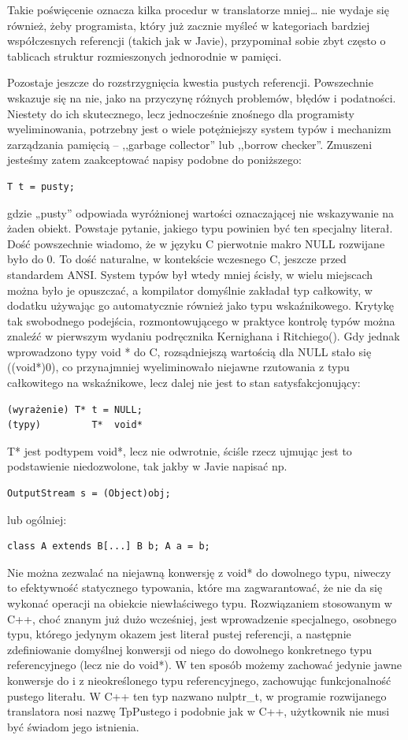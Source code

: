 Takie poświęcenie oznacza kilka procedur w translatorze mniej… nie wydaje się również, żeby programista, który już zacznie myśleć w kategoriach bardziej współczesnych referencji (takich jak w Javie), przypominał sobie zbyt często o tablicach struktur rozmieszonych jednorodnie w pamięci.

Pozostaje jeszcze do rozstrzygnięcia kwestia pustych referencji. Powszechnie wskazuje się na nie, jako na przyczynę różnych problemów, błędów i podatności. Niestety do ich skutecznego, lecz jednocześnie znośnego dla programisty wyeliminowania, potrzebny jest o wiele potężniejszy system typów i mechanizm zarządzania pamięcią – ,,garbage collector'' lub ,,borrow checker''. Zmuszeni jesteśmy zatem zaakceptować napisy podobne do poniższego:
\begin{lstlisting}
T t = pusty;    
\end{lstlisting}
 gdzie „pusty” odpowiada wyróżnionej wartości oznaczającej nie wskazywanie na żaden obiekt. Powstaje  pytanie, jakiego typu powinien być ten specjalny literał. Dość powszechnie wiadomo, że w języku C pierwotnie makro NULL rozwijane było do 0\cite[str.~214]{KiR}. To dość naturalne, w kontekście wczesnego C, jeszcze przed standardem ANSI. System typów był wtedy mniej ścisły, w wielu miejscach można było je opuszczać, a kompilator domyślnie zakładał typ całkowity, w dodatku używając go automatycznie również jako typu wskaźnikowego. Krytykę tak swobodnego podejścia, rozmontowującego w praktyce kontrolę typów można znaleźć w pierwszym wydaniu podręcznika Kernighana i Ritchiego(\cite{KiR}). Gdy jednak wprowadzono  typy void * do C, rozsądniejszą wartością dla NULL stało się ((void*)0), co przynajmniej wyeliminowało niejawne rzutowania z typu całkowitego na wskaźnikowe, lecz dalej nie jest to stan satysfakcjonujący:
\begin{lstlisting}
(wyrażenie) T* t = NULL;
(typy)         T*  void*
\end{lstlisting}
T* jest podtypem void*, lecz nie odwrotnie, ściśle rzecz ujmując jest to podstawienie niedozwolone, tak jakby w Javie napisać np.
\begin{lstlisting}
OutputStream s = (Object)obj;
\end{lstlisting}
lub ogólniej:
\begin{lstlisting}
class A extends B[...] B b; A a = b;
\end{lstlisting}
Nie można zezwalać na niejawną konwersję z void* do dowolnego typu, niweczy to efektywność statycznego typowania, które ma zagwarantować, że nie da się wykonać operacji na obiekcie niewłaściwego typu. Rozwiązaniem stosowanym w C++, choć znanym już dużo wcześniej\cite[str.256 - zob. nil\_typ]{waite_goos}, jest wprowadzenie specjalnego, osobnego typu, którego jedynym okazem jest literał pustej referencji, a następnie zdefiniowanie domyślnej konwersji od niego do dowolnego konkretnego typu referencyjnego (lecz nie do void*). W ten sposób możemy zachować jedynie jawne konwersje do i z nieokreślonego typu referencyjnego,  zachowując funkcjonalność pustego literału. W C++ ten typ nazwano nulptr\_t, w programie rozwijanego translatora nosi nazwę TpPustego i podobnie jak w C++, użytkownik nie musi być świadom jego istnienia.
